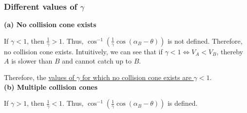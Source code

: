 \subsubsection*{Different values of \( \gamma \)}

\textbf{(a) No collision cone exists}

If \( \gamma < 1 \), then \( \frac{1}{\gamma} > 1 \).
Thus, \( \cos^{-1} \left( \frac{1}{\gamma} \cos (\alpha_B - \theta) \right) \) is not defined.
Therefore, no collision cone exists.
Intuitively, we can see that if \( \gamma < 1 \iff V_A < V_B \), thereby \( A \) is slower than \( B \) and cannot catch up to \( B \).

Therefore, the \underline{values of \( \gamma \) for which no collision cone exists are \( \gamma < 1 \)}. \\
\textbf{(b) Multiple collision cones}

If \( \gamma > 1 \), then \( \frac{1}{\gamma} < 1 \).
Thus, \( \cos^{-1} \left( \frac{1}{\gamma} \cos (\alpha_B - \theta) \right) \) is defined.
